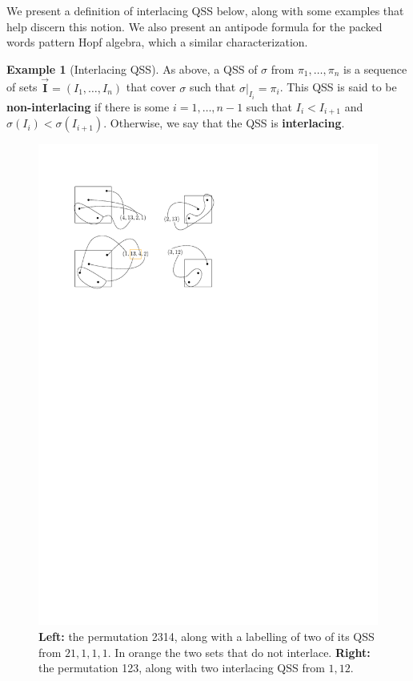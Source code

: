 \documentclass[12pt, reqno]{amsart}
\theoremstyle{definition}
\newtheorem{smpl}[thm]{Example}
\newcommand{\III}{\vec{\mathbf{I}}}
\begin{document}
We present a definition of interlacing QSS below, along with some examples that help discern this notion.
We also present an antipode formula for the packed words pattern Hopf algebra, which a similar characterization.

\begin{smpl}[Interlacing QSS]
As above, a QSS of $\sigma $ from $\pi_1, \dots, \pi_n$ is a sequence of sets $\III = (I_1, \dots, I_n)$ that cover $\sigma$ such that $\sigma|_{I_i} = \pi_i$.
This QSS is said to be \textbf{non-interlacing} if there is some $i=1, \dots, n-1$ such that $I_i < I_{i+1}$ and $\sigma(I_i) < \sigma(I_{i+1})$.
Otherwise, we say that the QSS is \textbf{interlacing}.
\begin{figure}[h]
    \centering
    \includegraphics{images/interlacing_25314.pdf}
    \caption{\textbf{Left:} the permutation 2314, along with a labelling of two of its QSS from $21, 1, 1, 1$. In orange the two sets that do not interlace. \textbf{Right:} the permutation 123, along with two interlacing QSS from $1, 12$.\label{fig:interlacingQSSsmpl}}
\end{figure}


\end{smpl}
\end{document}
